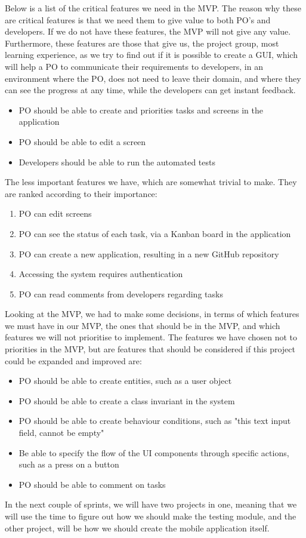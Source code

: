 Below is a list of the critical features we need in the MVP.
The reason why these are critical features is that we need them to give value to both PO's and developers.
If we do not have these features, the MVP will not give any value.
Furthermore, these features are those that give us, the project group, most learning experience, as we try to find out if it is possible to create a GUI, which will help a PO to communicate their requirements to developers, in an environment where the PO, does not need to leave their domain, and where they can see the progress at any time, while the developers can get instant feedback.

\begin{itemize}
    \item PO should be able to create and priorities tasks and screens in the application
    \item PO should be able to edit a screen
    \item Developers should be able to run the automated tests
\end{itemize}

The less important features we have, which are somewhat trivial to make.
They are ranked according to their importance:

\begin{enumerate}
    \item PO can edit screens
    \item PO can see the status of each task, via a Kanban board in the application
    \item PO can create a new application, resulting in a new GitHub repository
    \item Accessing the system requires authentication
    \item PO can read comments from developers regarding tasks
\end{enumerate}

Looking at the MVP, we had to make some decisions, in terms of which features we must have in our MVP, the ones that should be in the MVP, and which features we will not prioritise to implement.
The features we have chosen not to priorities in the MVP, but are features that should be considered if this project could be expanded and improved are:

\begin{itemize}
    \item PO should be able to create entities, such as a user object
    \item PO should be able to create a class invariant in the system
    \item PO should be able to create behaviour conditions, such as "this text input field, cannot be empty"
    \item Be able to specify the flow of the UI components through specific actions, such as a press on a button
    \item PO should be able to comment on tasks
\end{itemize}

In the next couple of sprints, we will have two projects in one, meaning that we will use the time to figure out how we should make the testing module, and the other project, will be how we should create the mobile application itself.
